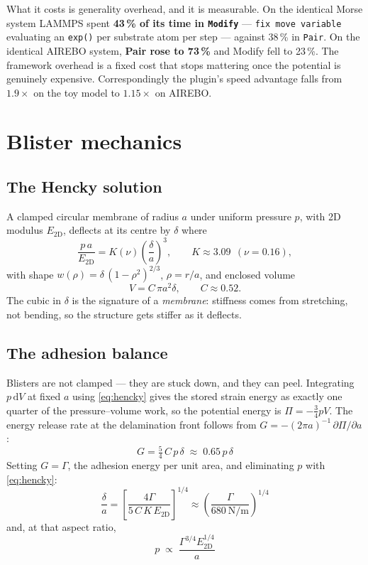 \documentclass[11pt,a4paper]{article}
\newcommand{\ED}{E_{2\mathrm{D}}}
\begin{document}
What it costs is generality overhead, and it is measurable. On the identical
Morse system LAMMPS spent \textbf{43\,\% of its time in \texttt{Modify}} ---
\texttt{fix move variable} evaluating an \texttt{exp()} per substrate atom per
step --- against 38\,\% in \texttt{Pair}. On the identical AIREBO system,
\textbf{Pair rose to 73\,\%} and Modify fell to 23\,\%. The framework overhead
is a fixed cost that stops mattering once the potential is genuinely expensive.
Correspondingly the plugin's speed advantage falls from $1.9\times$ on the toy
model to $1.15\times$ on AIREBO.

\section{Blister mechanics}

\subsection{The Hencky solution}

A clamped circular membrane of radius $a$ under uniform pressure $p$, with 2D
modulus $\ED$, deflects at its centre by $\delta$ where
\begin{equation}
\frac{p\,a}{\ED} = K(\nu)\left(\frac{\delta}{a}\right)^{3},
\qquad K \approx 3.09 \ \ (\nu = 0.16),
\label{eq:hencky}
\end{equation}
with shape $w(\rho) = \delta\,(1-\rho^2)^{2/3}$, $\rho = r/a$, and enclosed
volume
\begin{equation}
V = C\,\pi a^2 \delta, \qquad C \approx 0.52 .
\end{equation}
The cubic in $\delta$ is the signature of a \emph{membrane}: stiffness comes
from stretching, not bending, so the structure gets stiffer as it deflects.

\subsection{The adhesion balance}

Blisters are not clamped --- they are stuck down, and they can peel. Integrating
$p\,\mathrm{d}V$ at fixed $a$ using \eqref{eq:hencky} gives the stored strain
energy as exactly one quarter of the pressure--volume work, so the potential
energy is $\Pi = -\tfrac34 pV$. The energy release rate at the delamination
front follows from $G = -(2\pi a)^{-1}\,\partial\Pi/\partial a$:
\begin{equation}
\boxed{\;G = \tfrac54\,C\,p\,\delta \;\approx\; 0.65\,p\,\delta\;}
\label{eq:G}
\end{equation}
Setting $G = \Gamma$, the adhesion energy per unit area, and eliminating $p$
with \eqref{eq:hencky}:
\begin{equation}
\boxed{\;\frac{\delta}{a} = \left[\frac{4\Gamma}{5\,C\,K\,\ED}\right]^{1/4}
   \approx \left(\frac{\Gamma}{680\ \mathrm{N/m}}\right)^{1/4}\;}
\label{eq:aspect}
\end{equation}
and, at that aspect ratio,
\begin{equation}
\boxed{\;p \;\propto\; \frac{\Gamma^{3/4}\ED^{1/4}}{a}\;}
\end{equation}
\end{document}
